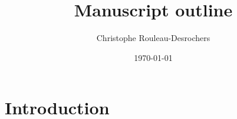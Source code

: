 \documentclass{article}\usepackage[]{graphicx}\usepackage[]{xcolor}
\begin{document}

\title{Manuscript outline}
\author{Christophe Rouleau-Desrochers}
\date{\today}
\maketitle

\newcommand{\Ainc}{\textit{A. incana}}
\newcommand{\Ball}{\textit{B. alleghaniensis}}
\newcommand{\Bpap}{\textit{B. papyrifera}}
\newcommand{\Bpop}{\textit{B. populifolia}}





\section*{Introduction}
\end{document}
